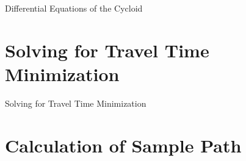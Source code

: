 \documentclass[12pt, a4paper]{article}
\begin{document}
        
        
        
        


		{Differential Equations of the Cycloid}





\section{Solving for Travel Time Minimization}

		{Solving for Travel Time Minimization}
        
        

\section{Calculation of Sample Path}
\end{document}
